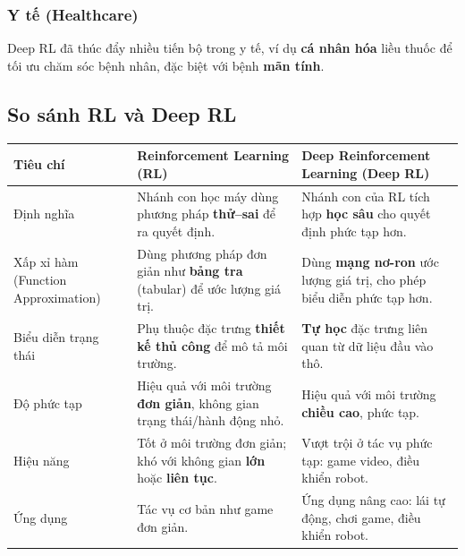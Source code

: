 \subsubsection{Y tế (Healthcare)}

\begin{vidu}[title={Chăm sóc sức khỏe cá nhân hóa}]
Deep RL đã thúc đẩy nhiều tiến bộ trong y tế, ví dụ \textbf{cá nhân hóa} liều thuốc để tối ưu chăm sóc bệnh nhân, đặc biệt với bệnh \textbf{mãn tính}.
\end{vidu}

\subsection{So sánh RL và Deep RL}

\begin{tinhchat}[title={Bảng so sánh Reinforcement Learning và Deep Reinforcement Learning}]
\begin{tabularx}{\linewidth}{>{\raggedright\arraybackslash}p{3.2cm}XX}
\textbf{Tiêu chí} & \textbf{Reinforcement Learning (RL)} & \textbf{Deep Reinforcement Learning (Deep RL)} \\
\midrule
Định nghĩa &
Nhánh con học máy dùng phương pháp \textbf{thử--sai} để ra quyết định. &
Nhánh con của RL tích hợp \textbf{học sâu} cho quyết định phức tạp hơn. \\
Xấp xỉ hàm (Function Approximation) &
Dùng phương pháp đơn giản như \textbf{bảng tra} (tabular) để ước lượng giá trị. &
Dùng \textbf{mạng nơ-ron} ước lượng giá trị, cho phép biểu diễn phức tạp hơn. \\
Biểu diễn trạng thái &
Phụ thuộc đặc trưng \textbf{thiết kế thủ công} để mô tả môi trường. &
\textbf{Tự học} đặc trưng liên quan từ dữ liệu đầu vào thô. \\
Độ phức tạp &
Hiệu quả với môi trường \textbf{đơn giản}, không gian trạng thái/hành động nhỏ. &
Hiệu quả với môi trường \textbf{chiều cao}, phức tạp. \\
Hiệu năng &
Tốt ở môi trường đơn giản; khó với không gian \textbf{lớn} hoặc \textbf{liên tục}. &
Vượt trội ở tác vụ phức tạp: game video, điều khiển robot. \\
Ứng dụng &
Tác vụ cơ bản như game đơn giản. &
Ứng dụng nâng cao: lái tự động, chơi game, điều khiển robot. \\
\end{tabularx}
\end{tinhchat}
